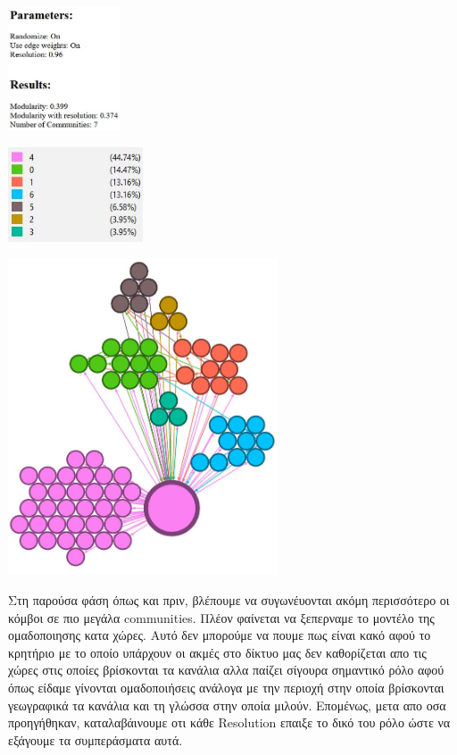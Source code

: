 \documentclass[12pt]{article}
\begin{document}
	\vspace{12pt}
	\vspace{12pt}
	\begin{center}
		\begin{adjustbox}{valign=t}
			\includegraphics[width=0.25\textwidth]{photos-files/section12/0.96/report.JPG}
		\end{adjustbox}
		\hfill
		\begin{adjustbox}{valign=t}
			\includegraphics[width=0.3\textwidth]{photos-files/section12/0.96/pososta.JPG}
		\end{adjustbox}
	\end{center}
	
	\vspace{12pt}
	\begin{center}
		\includegraphics[width=0.6\textwidth]{photos-files/section12/0.96/no_label_layout.JPG}
	\end{center}
	
	Στη παρούσα φάση όπως και πριν, βλέπουμε να συγωνέυονται ακόμη περισσότερο οι κόμβοι σε πιο μεγάλα communities. Πλέον φαίνεται να ξεπερναμε το μοντέλο της ομαδοποιησης κατα χώρες. Αυτό δεν μπορούμε να πουμε πως είναι κακό αφού το κρητήριο με το οποίο υπάρχουν οι ακμές στο δίκτυο μας δεν καθορίζεται απο τις χώρες στις οποίες βρίσκονται τα κανάλια αλλα παίζει σίγουρα σημαντικό ρόλο αφού όπως είδαμε γίνονται ομαδοποιήσεις ανάλογα με την περιοχή στην οποία βρίσκονται γεωγραφικά τα κανάλια και τη γλώσσα στην οποία μιλούν. Επομένως, μετα απο οσα προηγήθηκαν, καταλαβάινουμε οτι κάθε Resolution επαιξε το δικό του ρόλο ώστε να εξάγουμε τα συμπεράσματα αυτά.
	\label{chap:community_structure_(modularity)_12}
	
\end{document}
